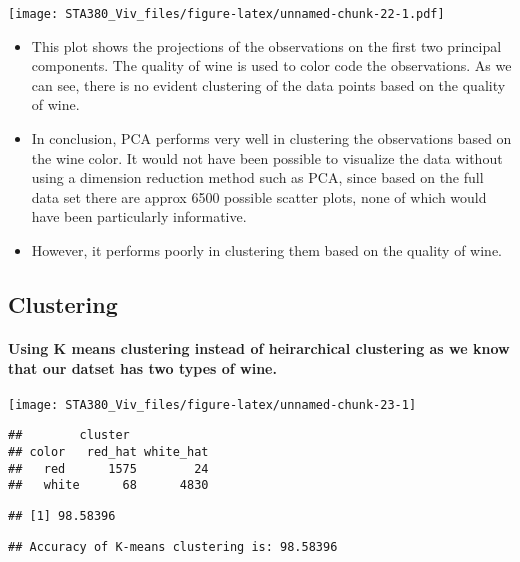 \documentclass[
  12pt,
]{article}
\begin{document}
\texttt{[image: STA380\_Viv\_files/figure-latex/unnamed-chunk-22-1.pdf]}

\begin{itemize}
\item
  This plot shows the projections of the observations on the first two
  principal components. The quality of wine is used to color code the
  observations. As we can see, there is no evident clustering of the
  data points based on the quality of wine.
\item
  In conclusion, PCA performs very well in clustering the observations
  based on the wine color. It would not have been possible to visualize
  the data without using a dimension reduction method such as PCA, since
  based on the full data set there are approx 6500 possible scatter
  plots, none of which would have been particularly informative.
\item
  However, it performs poorly in clustering them based on the quality of
  wine.
\end{itemize}

\hypertarget{clustering}{%
\subsection{Clustering}\label{clustering}}

\hypertarget{using-k-means-clustering-instead-of-heirarchical-clustering-as-we-know-that-our-datset-has-two-types-of-wine.}{%
\paragraph{Using K means clustering instead of heirarchical clustering
as we know that our datset has two types of
wine.}\label{using-k-means-clustering-instead-of-heirarchical-clustering-as-we-know-that-our-datset-has-two-types-of-wine.}}

\begin{center}\texttt{[image: STA380\_Viv\_files/figure-latex/unnamed-chunk-23-1]} \end{center}

\begin{verbatim}
##        cluster
## color   red_hat white_hat
##   red      1575        24
##   white      68      4830
\end{verbatim}

\begin{verbatim}
## [1] 98.58396
\end{verbatim}

\begin{verbatim}
## Accuracy of K-means clustering is: 98.58396
\end{verbatim}
\end{document}
